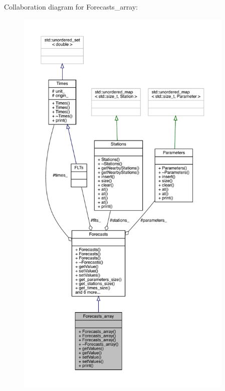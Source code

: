 Collaboration diagram for Forecasts\+\_\+array\+:
\nopagebreak
\begin{figure}[H]
\begin{center}
\leavevmode
\includegraphics[height=550pt]{class_forecasts__array__coll__graph}
\end{center}
\end{figure}
